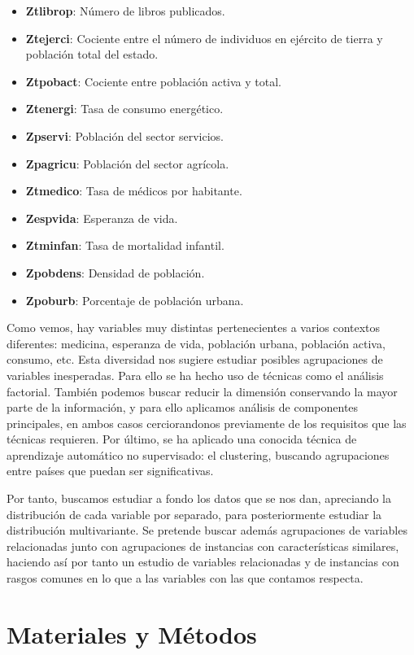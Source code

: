 \documentclass[letterpaper,11pt]{article}
\begin{document}
\begin{itemize}
    \item \textbf{Ztlibrop}: Número de libros publicados.
    \item \textbf{Ztejerci}: Cociente entre el número de individuos en ejército de tierra y población total del estado.
    \item \textbf{Ztpobact}: Cociente entre población activa y total.
    \item \textbf{Ztenergi}: Tasa de consumo energético.
    \item \textbf{Zpservi}: Población del sector servicios.
    \item \textbf{Zpagricu}: Población del sector agrícola.
    \item \textbf{Ztmedico}: Tasa de médicos por habitante.
    \item \textbf{Zespvida}: Esperanza de vida.
    \item \textbf{Ztminfan}: Tasa de mortalidad infantil.
    \item \textbf{Zpobdens}: Densidad de población.
    \item \textbf{Zpoburb}: Porcentaje de población urbana.
\end{itemize}

Como vemos, hay variables muy distintas pertenecientes a varios contextos diferentes: medicina, esperanza de vida, población urbana, población activa, consumo, etc. Esta diversidad nos sugiere estudiar posibles agrupaciones de variables inesperadas. Para ello se ha hecho uso de técnicas como el análisis factorial. También podemos buscar reducir la dimensión conservando la mayor parte de la información, y para ello aplicamos análisis de componentes principales, en ambos casos cerciorandonos previamente de los requisitos que las técnicas requieren. Por último, se ha aplicado una conocida técnica de aprendizaje automático no supervisado: el clustering, buscando agrupaciones entre países que puedan ser significativas.

Por tanto, buscamos estudiar a fondo los datos que se nos dan, apreciando la distribución de cada variable por separado, para posteriormente estudiar la distribución multivariante. Se pretende buscar además agrupaciones de variables relacionadas junto con agrupaciones de instancias con características similares, haciendo así por tanto un estudio de variables relacionadas y de instancias con rasgos comunes en lo que a las variables con las que contamos respecta.

\section{Materiales y Métodos}
\end{document}
